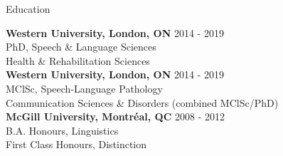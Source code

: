 \documentclass{resume} %
\begin{document}
\begin{rSection}{Education}

{\bf Western University, London, ON} \hfill {2014 - 2019} \\ 
PhD, Speech \& Language Sciences  \\
Health \& Rehabilitation Sciences \bigskip \\

{\bf Western University, London, ON} \hfill {2014 - 2019} \\ 
MClSc, Speech-Language Pathology  \\
Communication Sciences \& Disorders (combined MClSc/PhD) \bigskip \\

{\bf McGill University, Montr\'eal, QC} \hfill {2008 - 2012} \\
B.A. Honours, Linguistics \\
First Class Honours, Distinction

\end{rSection}
\end{document}
